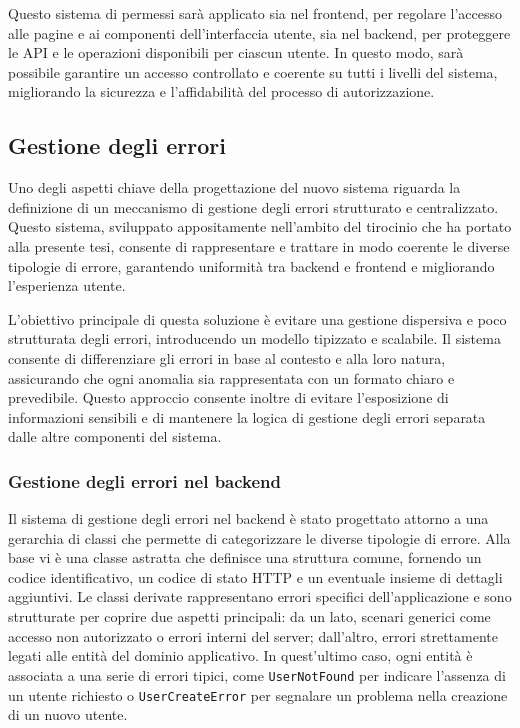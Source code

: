Questo sistema di permessi sarà applicato sia nel frontend, per regolare l'accesso alle pagine e ai componenti dell'interfaccia utente, sia nel backend, per proteggere le API e le operazioni disponibili per ciascun utente. In questo modo, sarà possibile garantire un accesso controllato e coerente su tutti i livelli del sistema, migliorando la sicurezza e l’affidabilità del processo di autorizzazione.

\subsection{Gestione degli errori}
Uno degli aspetti chiave della progettazione del nuovo sistema riguarda la definizione di un meccanismo di gestione degli errori strutturato e centralizzato. Questo sistema, sviluppato appositamente nell’ambito del tirocinio che ha portato alla presente tesi, consente di rappresentare e trattare in modo coerente le diverse tipologie di errore, garantendo uniformità tra backend e frontend e migliorando l’esperienza utente.

L'obiettivo principale di questa soluzione è evitare una gestione dispersiva e poco strutturata degli errori, introducendo un modello tipizzato e scalabile. Il sistema consente di differenziare gli errori in base al contesto e alla loro natura, assicurando che ogni anomalia sia rappresentata con un formato chiaro e prevedibile. Questo approccio consente inoltre di evitare l'esposizione di informazioni sensibili e di mantenere la logica di gestione degli errori separata dalle altre componenti del sistema.

\subsubsection{Gestione degli errori nel backend}
Il sistema di gestione degli errori nel backend è stato progettato attorno a una gerarchia di classi che permette di categorizzare le diverse tipologie di errore. Alla base vi è una classe astratta che definisce una struttura comune, fornendo un codice identificativo, un codice di stato HTTP e un eventuale insieme di dettagli aggiuntivi. Le classi derivate rappresentano errori specifici dell’applicazione e sono strutturate per coprire due aspetti principali: da un lato, scenari generici come accesso non autorizzato o errori interni del server; dall’altro, errori strettamente legati alle entità del dominio applicativo. In quest’ultimo caso, ogni entità è associata a una serie di errori tipici, come \texttt{UserNotFound} per indicare l’assenza di un utente richiesto o \texttt{UserCreateError} per segnalare un problema nella creazione di un nuovo utente.


